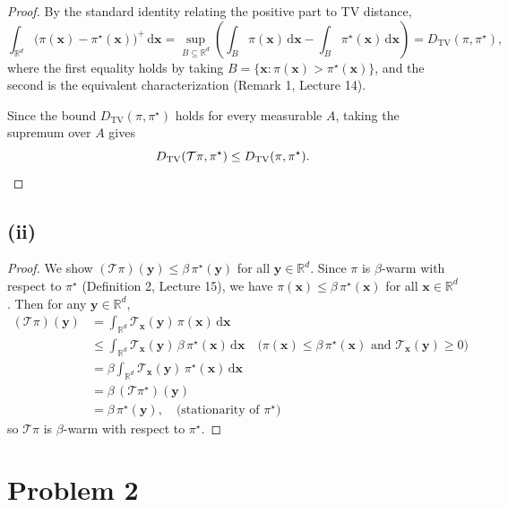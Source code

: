 \documentclass[12pt]{article}
\begin{document}
\begin{proof}
By the standard identity relating the positive part to TV distance,
\[
\int_{\mathbb{R}^d} \bigl(\pi(\mathbf{x}) - \pi^\star(\mathbf{x})\bigr)^+ \,\mathrm{d}\mathbf{x}
= \sup_{B \subseteq \mathbb{R}^d} \left( \int_{B} \pi(\mathbf{x}) \,\mathrm{d}\mathbf{x} - \int_{B} \pi^\star(\mathbf{x}) \,\mathrm{d}\mathbf{x} \right)
= D_{\mathrm{TV}}(\pi, \pi^\star),
\]
where the first equality holds by taking $B = \{\mathbf{x} : \pi(\mathbf{x}) > \pi^\star(\mathbf{x})\}$, and the second is the equivalent characterization (Remark 1, Lecture 14).

Since the bound $D_{\mathrm{TV}}(\pi, \pi^\star)$ holds for every measurable $A$, taking the supremum over $A$ gives
\[
D_{\mathrm{TV}}(\mathcal{T}\pi, \pi^\star) \leq D_{\mathrm{TV}}(\pi, \pi^\star). \qedhere
\]
\end{proof}

\subsection*{(ii)}

\begin{proof}
We show $(\mathcal{T}\pi)(\mathbf{y}) \leq \beta \, \pi^\star(\mathbf{y})$ for all $\mathbf{y} \in \mathbb{R}^d$. Since $\pi$ is $\beta$-warm with respect to $\pi^\star$ (Definition 2, Lecture 15), we have $\pi(\mathbf{x}) \leq \beta \, \pi^\star(\mathbf{x})$ for all $\mathbf{x} \in \mathbb{R}^d$. Then for any $\mathbf{y} \in \mathbb{R}^d$,
\begin{align*}
(\mathcal{T}\pi)(\mathbf{y})
&= \int_{\mathbb{R}^d} \mathcal{T}_{\mathbf{x}}(\mathbf{y})\, \pi(\mathbf{x}) \,\mathrm{d}\mathbf{x} \\
&\leq \int_{\mathbb{R}^d} \mathcal{T}_{\mathbf{x}}(\mathbf{y})\, \beta \, \pi^\star(\mathbf{x}) \,\mathrm{d}\mathbf{x} \quad \text{($\pi(\mathbf{x}) \leq \beta\, \pi^\star(\mathbf{x})$ and } \mathcal{T}_{\mathbf{x}}(\mathbf{y}) \geq 0\text{)} \\
&= \beta \int_{\mathbb{R}^d} \mathcal{T}_{\mathbf{x}}(\mathbf{y})\, \pi^\star(\mathbf{x}) \,\mathrm{d}\mathbf{x} \\
&= \beta \, (\mathcal{T}\pi^\star)(\mathbf{y}) \\
&= \beta \, \pi^\star(\mathbf{y}), \quad \text{(stationarity of $\pi^\star$)}
\end{align*}
so $\mathcal{T}\pi$ is $\beta$-warm with respect to $\pi^\star$.
\end{proof}

\section*{Problem 2}
\end{document}
